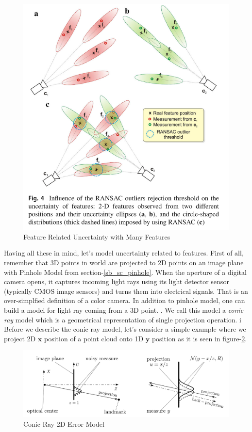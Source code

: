 \documentclass[a4paper]{report}
\numberwithin{figure}{section}
\begin{document}
\begin{figure}[H]
	\centering
  \includegraphics[width=0.7\linewidth,natwidth=640,natheight=640]
  {fig/ref_imgs/feature_related_uncertainty_many.png}
  \caption{Feature Related Uncertainty with Many Features}
	\label{fig:feature_related_uncertainty_many}
\end{figure}



Having all these in mind, let's model uncertainty related to features.
First of all, remember that 3D points in world are projected to 2D points on an image plane with 
Pinhole Model from section-\ref{sb_sc_pinhole}. When the aperture of a digital 
camera opens, it captures incoming light rays using its light detector sensor 
(typically CMOS image sensors) and turns them into electrical signals. That 
is an over-simplfied definition of a color camera. In addition to pinhole 
model, one can build a model for light ray coming from a 3D point.
. We call this model 
a \textit{conic ray} model which is a geometrical representation of 
single projection operation. i
Before we describe the conic ray model, let's consider a simple example where we 
project 2D $\mathbf{x}$ position of a point cloud onto 1D $\mathbf{y}$ position
as it is seen in figure-\ref{fig:conic_ray_2d_error_model}.


\begin{figure}[H]
	\centering
  \includegraphics[width=0.7\linewidth,natwidth=640,natheight=640]
  {fig/ref_imgs/conic_ray_2d_model.png}
  \caption{Conic Ray 2D Error Model}
	\label{fig:conic_ray_2d_error_model}
\end{figure}
\end{document}
